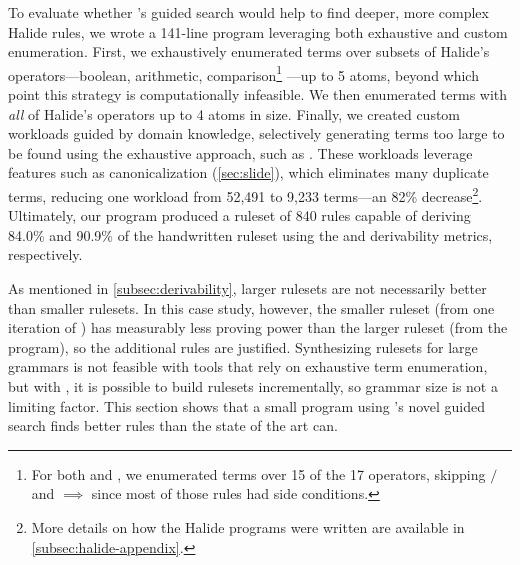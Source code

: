 To evaluate whether \enumo's
  guided search would help to find deeper, more complex Halide rules,
  we wrote a 141-line \enumo program
  leveraging both exhaustive and custom enumeration.
  First, we exhaustively enumerated terms over subsets of Halide's
  operators---boolean, arithmetic,
  comparison\footnote{For both  and \enumo,
  we enumerated terms over
  15 of the 17 operators, skipping $/$ and $\implies$ since
  most of those rules had side conditions.}%
  ---up to 5 atoms, beyond which point this strategy
  is computationally infeasible.
  We then enumerated
  terms with \textit{all} of
  Halide's operators up to
  4 atoms in size.
Finally, we created custom
  workloads guided by domain knowledge,
  selectively generating terms too large to be
  found using the exhaustive approach,
  such as .
  These workloads leverage \enumo features
  such as canonicalization
  (\autoref{sec:slide}), which eliminates many duplicate terms,
  reducing one workload
  from 52,491 to 9,233 terms---an 82\%
  decrease\footnote{More details on how the Halide programs
  were written are available in \autoref{subsec:halide-appendix}.}.
 Ultimately, our \enumo program produced a ruleset of 840 rules
  capable of deriving
  84.0\% and 90.9\% of the handwritten ruleset using
  the \lhs and \lhsandrhs derivability
  metrics, respectively.

As mentioned in \autoref{subsec:derivability}, larger rulesets are not
  necessarily better than smaller rulesets.
In this case study, however, the smaller ruleset (from one iteration of )
  has measurably less proving power than the larger ruleset
  (from the \enumo program), so the additional rules are justified.
Synthesizing rulesets for large grammars is not feasible
  with tools that rely on exhaustive term enumeration,
  but with \enumo, it is possible to build
  rulesets incrementally, so grammar size is not a
  limiting factor.
This section shows that a small program
using \enumo's novel guided search finds better rules than
the state of the art can.

